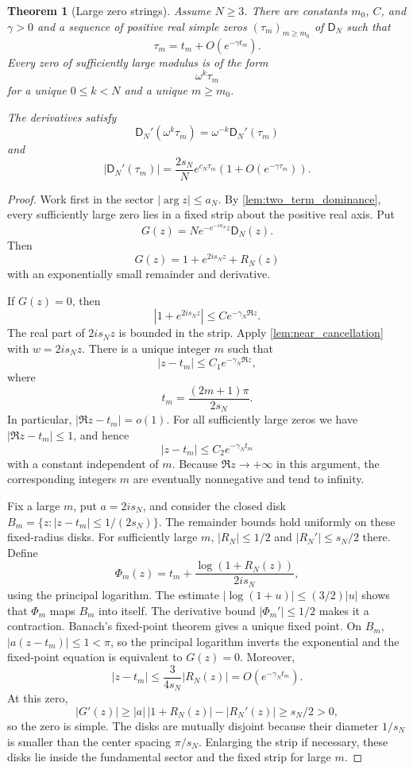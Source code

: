 \documentclass[11pt]{article}
\newtheorem{theorem}{Theorem}[section]
\theoremstyle{definition}
\theoremstyle{remark}
\newcommand{\Dfun}{\mathsf D}
\begin{document}
\begin{theorem}[Large zero strings]\label{thm:large_zero_strings}
Assume $N\geq3$.  There are constants $m_0$, $C$, and $\gamma>0$ and a sequence of positive real simple zeros $(\tau_m)_{m\geq m_0}$ of $\Dfun_N$ such that
\[
\tau_m
=
 t_m+O(e^{-\gamma t_m}).
\]
Every zero of sufficiently large modulus is of the form
\[
\omega^k\tau_m
\]
for a unique $0\leq k<N$ and a unique $m\geq m_0$.

The derivatives satisfy
\[
\Dfun_N'(\omega^k\tau_m)
=
\omega^{-k}\Dfun_N'(\tau_m)
\]
and
\[
|\Dfun_N'(\tau_m)|
=
\frac{2s_N}{N}e^{c_N\tau_m}
\left(1+O(e^{-\gamma\tau_m})\right).
\]
\end{theorem}

\begin{proof}
Work first in the sector $|\arg z|\leq a_N$.  By \cref{lem:two_term_dominance}, every sufficiently large zero lies in a fixed strip about the positive real axis.  Put
\[
G(z)=N e^{-e^{-ia_N}z}\Dfun_N(z).
\]
Then
\[
G(z)=1+e^{2is_Nz}+R_N(z)
\]
with an exponentially small remainder and derivative.

If $G(z)=0$, then
\[
|1+e^{2is_Nz}|
\leq
C e^{-\gamma_N\Re z}.
\]
The real part of $2is_Nz$ is bounded in the strip.  Apply
\cref{lem:near_cancellation} with $w=2is_Nz$.  There is a unique
integer $m$ such that
\[
|z-t_m|\leq C_1e^{-\gamma_N\Re z},
\]
where
\[
 t_m=\frac{(2m+1)\pi}{2s_N}.
\]
In particular, $|\Re z-t_m|=o(1)$.  For all sufficiently large zeros
we have $|\Re z-t_m|\leq1$, and hence
\[
|z-t_m|\leq C_2e^{-\gamma_Nt_m}
\]
with a constant independent of $m$.
Because $\Re z\to+\infty$ in this argument, the corresponding integers
$m$ are eventually nonnegative and tend to infinity.

Fix a large $m$, put $a=2is_N$, and consider the closed disk
$B_m=\{z:|z-t_m|\leq 1/(2s_N)\}$. The remainder bounds hold
uniformly on these fixed-radius disks. For sufficiently large $m$,
$|R_N|\leq 1/2$ and $|R_N'|\leq s_N/2$ there. Define
\[
\Phi_m(z)=t_m+\frac{\log(1+R_N(z))}{2is_N},
\]
using the principal logarithm. The estimate
$|\log(1+u)|\leq(3/2)|u|$ shows that $\Phi_m$ maps $B_m$ into
itself. The derivative bound $|\Phi_m'|\leq1/2$ makes it a contraction.
Banach's fixed-point theorem gives a unique fixed point.
On $B_m$, $|a(z-t_m)|\leq1<\pi$, so the principal logarithm inverts
the exponential and the fixed-point equation is equivalent to $G(z)=0$.
Moreover,
\[
|z-t_m|\leq\frac{3}{4s_N}|R_N(z)|=O(e^{-\gamma_Nt_m}).
\]
At this zero,
\[
|G'(z)|\geq |a|\,|1+R_N(z)|-|R_N'(z)|\geq s_N/2>0,
\]
so the zero is simple. The disks are mutually disjoint because their
diameter $1/s_N$ is smaller than the center spacing $\pi/s_N$.
Enlarging the strip if necessary, these disks lie inside the fundamental
sector and the fixed strip for large $m$.


\end{proof}
\end{document}
